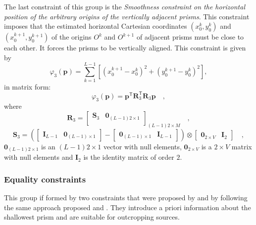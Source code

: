 The last constraint of this group is the \textit{Smoothness constraint on the horizontal position of 
the arbitrary origins of the vertically adjacent prisms}. This constraint imposes that the estimated horizontal 
Cartesian coordinates $(x_{0}^{k}, y_{0}^{k})$ and $(x_{0}^{k+1}, y_{0}^{k+1})$ of the origins $O^{k}$ and $O^{k+1}$ 
of adjacent prisms must be close to each other. It forces the prisms to be vertically aligned. This constraint 
is given by
\begin{equation}\label{eq:phi3_sum}
\varphi_{3}(\textbf{p}) = \sum\limits^{L-1}_{k=1}\left[\left(x_{0}^{k+1} - x_{0}^{k}\right)^2 + \left(y_{0}^{k+1} - y_{0}^{k}\right)^2 \right] ,
\end{equation}
in matrix form:
\begin{equation}
\varphi_{3}(\mathbf{p}) = \mathbf{p}^{\mathsf{T}} \mathbf{R}^{\mathsf{T}}_{3}\mathbf{R}_{3}\mathbf{p} \quad ,
\label{eq:phi3}
\end{equation}
where 
\begin{equation}
\mathbf{R}_{3} = 
\begin{bmatrix}
\mathbf{S}_{3} & \mathbf{0}_{(L-1)2 \times 1} \\
\end{bmatrix}_{(L-1)2 \times M} \quad ,
\label{eq:R3-matrix}
\end{equation}
\begin{equation}
\mathbf{S}_{3} =
\left( 
\begin{bmatrix} \mathbf{I}_{L-1} & \mathbf{0}_{(L-1) \times 1} \end{bmatrix} -
\begin{bmatrix} \mathbf{0}_{(L-1) \times 1} & \mathbf{I}_{L-1} \end{bmatrix} 
\right) \otimes 
\begin{bmatrix} \mathbf{0}_{2 \times V} & \mathbf{I}_{2} \end{bmatrix} \quad ,
\label{eq:S3-matrix}
\end{equation}
$\mathbf{0}_{(L-1)2 \times 1}$ is an $(L-1)2 \times 1$ vector with null elements,
$\mathbf{0}_{2 \times V}$ is a $2 \times V$ matrix with null elements and 
$\mathbf{I}_{2}$ is the identity matrix of order $2$.

\subsubsection{Equality constraints}

This group if formed by two constraints that were proposed by \cite{oliveirajr-etal2011} and \cite{oliveirajr-barbosa2013} by following the same approach proposed \cite{barbosa-etal1997} and 
\cite{barbosa-etal1999}. They introduce a priori information about the shallowest prism and are  suitable for outcropping sources.

